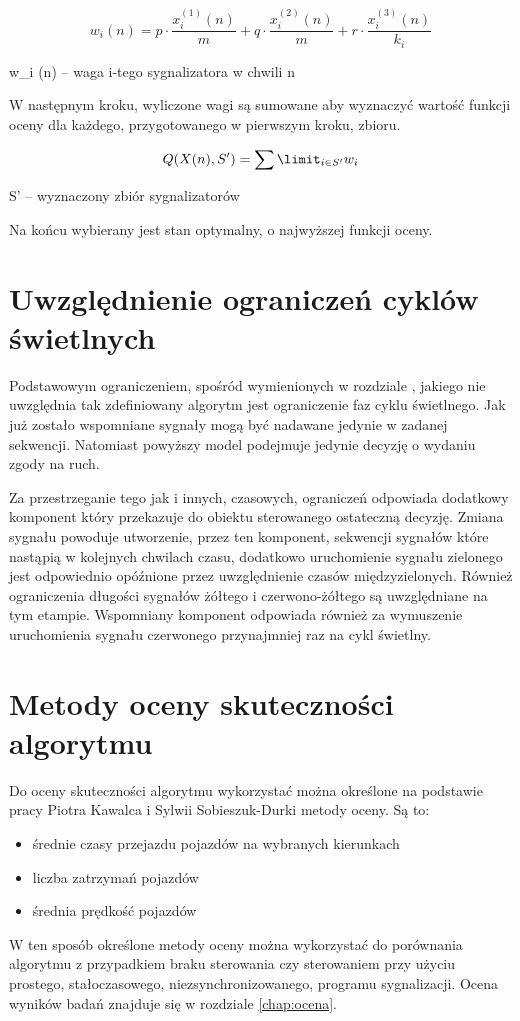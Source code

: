 \begin{equation}
	w_{i} (n) = p \cdot \frac{x^{(1)}_{i} (n)}{m} + q \cdot \frac{x^{(2)}_{i} (n)}{m} + r \cdot \frac{x^{(3)}_{i} (n)}{k_{i}}
\end{equation}

w_{i} (n) \textrm{ -- waga i-tego sygnalizatora w chwili n}

\vspace{0.5cm}
W następnym kroku, wyliczone wagi są sumowane aby wyznaczyć wartość funkcji oceny dla każdego, przygotowanego w pierwszym kroku, zbioru.

\begin{equation}
	Q (X(n), S') = \sum\limit_{i \in S'} w_{i}
\end{equation}

S' \textrm{ -- wyznaczony zbiór sygnalizatorów}

\vspace{0.5cm}
Na końcu wybierany jest stan optymalny, o najwyższej funkcji oceny.

\section{Uwzględnienie ograniczeń cyklów świetlnych}
Podstawowym ograniczeniem, spośród wymienionych w rozdziale \label{sec:model_ograniczenia}, jakiego nie uwzględnia tak zdefiniowany algorytm jest ograniczenie faz cyklu świetlnego. Jak już zostało wspomniane  sygnały mogą być nadawane jedynie w zadanej sekwencji. Natomiast powyższy model podejmuje jedynie decyzję o wydaniu zgody na ruch.

Za przestrzeganie tego jak i innych, czasowych, ograniczeń odpowiada dodatkowy komponent który przekazuje do obiektu sterowanego ostateczną decyzję. Zmiana sygnału powoduje utworzenie, przez ten komponent, sekwencji sygnałów które nastąpią w kolejnych chwilach czasu, dodatkowo uruchomienie sygnału zielonego jest odpowiednio opóźnione przez uwzględnienie czasów międzyzielonych. Również ograniczenia długości sygnałów żółtego i czerwono-żółtego są uwzględniane na tym etampie. Wspomniany komponent odpowiada również za wymuszenie uruchomienia sygnału czerwonego przynajmniej raz na cykl świetlny.

\section{Metody oceny skuteczności algorytmu}
Do oceny skuteczności algorytmu wykorzystać można określone na podstawie pracy Piotra Kawalca i Sylwii Sobieszuk-Durki \cite{kawalec+sobieszuk-durka} metody oceny. Są to:
\begin{itemize}
	\item średnie czasy przejazdu pojazdów na wybranych kierunkach
	\item liczba zatrzymań pojazdów
	\item średnia prędkość pojazdów
\end{itemize}

W ten sposób określone metody oceny można wykorzystać do porównania algorytmu z przypadkiem braku sterowania czy sterowaniem przy użyciu prostego, stałoczasowego, niezsynchronizowanego, programu sygnalizacji. Ocena wyników badań znajduje się w rozdziale \ref{chap:ocena}.